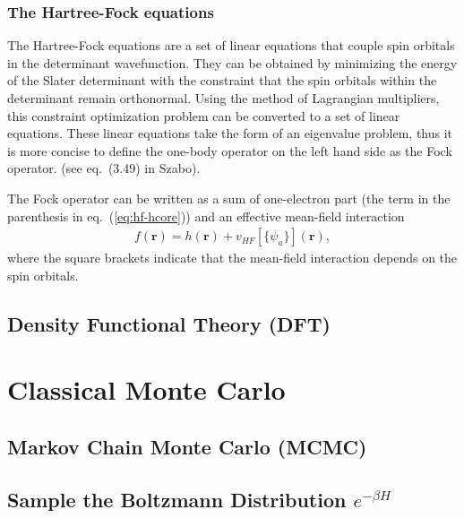 \documentclass[draftthesis,fullpage]{uiucthesis}
\newcommand{\bs}{\boldsymbol}
\begin{document}
\subsubsection{The Hartree-Fock equations}
The Hartree-Fock equations are a set of linear equations that couple spin orbitals in the determinant wavefunction. They can be obtained by minimizing the energy of the Slater determinant with the constraint that the spin orbitals within the determinant remain orthonormal. Using the method of Lagrangian multipliers, this constraint optimization problem can be converted to a set of linear equations. These linear equations take the form of an eigenvalue problem, thus it is more concise to define the one-body operator on the left hand side as the Fock operator. (see eq.~(3.49) in Szabo).

The Fock operator can be written as a sum of one-electron part (the term in the parenthesis in eq.~(\ref{eq:hf-hcore})) and an effective mean-field interaction
\begin{align}
f(\bs{r}) = h(\bs{r}) + v_{HF}[\{\psi_a\}](\bs{r}),
\end{align}
where the square brackets indicate that the mean-field interaction depends on the spin orbitals.


\subsection{Density Functional Theory (DFT)}


\section{Classical Monte Carlo}


\subsection{Markov Chain Monte Carlo (MCMC)}


\subsection{Sample the Boltzmann Distribution $e^{-\beta H}$}
\end{document}
